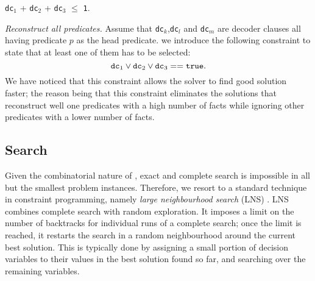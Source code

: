 \begin{center}
	\texttt{dc}$_1$ + \texttt{dc}$_2$ + \texttt{dc}$_3$ $\leq$ \texttt{1}.
\end{center}




\textit{Reconstruct all predicates.}
Assume that \texttt{dc}$_k$,\texttt{dc}$_l$ and \texttt{dc}$_m$ are decoder clauses all having predicate $p$ as the head predicate.
we introduce the following constraint to state that at least one of them has to be selected: %
$$ \text{\texttt{dc}}_1 \vee \text{\texttt{dc}}_2 \vee \text{\texttt{dc}}_3 == \text{\texttt{true}}.$$
We have noticed that this constraint allows the solver to find good solution faster; the reason being that this constraint eliminates the solutions that reconstruct well one predicates with a high number of facts while ignoring other predicates with a lower number of facts.



\subsection{Search}

Given the combinatorial nature of , exact and complete search is impossible in all but the smallest problem instances.
Therefore, we resort to a standard technique in constraint programming, namely \textit{large neighbourhood search} (LNS) \cite{Ahuja:2002:SVL:772382.772385}. LNS combines complete search with random exploration.
It imposes a limit on the number of backtracks for individual runs of a complete search; once the limit is reached, it restarts the search in a random neighbourhood around the current best solution.
This is typically done by assigning a small portion of decision variables to their values in the best solution found so far, and searching over the remaining variables.


